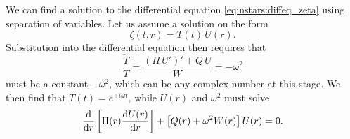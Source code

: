 We can find a solution to the differential equation \eqref{eq:nstars:diffeq_zeta} using separation of variables.
Let us assume a solution on the form
\begin{equation}
	\zeta(t,r) = T(t) \, U(r) .
\label{eq:nstars:separation_of_variables}
\end{equation}
Substitution into the differential equation then requires that
\begin{equation}
	\frac{\ddot{T}}{T} = \frac{\left( \Pi \, U' \right)' + Q \, U}{W} = -\omega^2
\end{equation}
must be a constant $-\omega^2$, which can be any complex number at this stage.
We then find that $T(t) = e^{\pm i \omega t}$, while $U(r)$ and $\omega^2$ must solve
\begin{equation}
	\odv*{ \left[ \Pi(r) \odv{U(r)}{r} \right] }{r} + \left[ Q(r) + \omega^2 W(r) \right] U(r) = 0 .
\label{eq:nstars:diffeq_U}
\end{equation}

